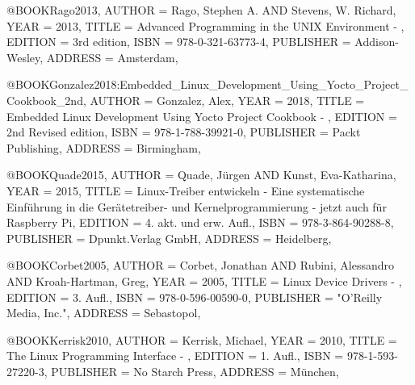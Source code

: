 @BOOK{Rago2013,
	AUTHOR = {Rago, Stephen A. AND Stevens, W. Richard},
	YEAR = {2013},
	TITLE = {Advanced Programming in the UNIX Environment - },
	EDITION = {3rd edition},
	ISBN = {978-0-321-63773-4},
	PUBLISHER = {Addison-Wesley},
	ADDRESS = {Amsterdam},
}


@BOOK{Gonzalez2018:Embedded_Linux_Development_Using_Yocto_Project_Cookbook_2nd,
	AUTHOR = {Gonzalez, Alex},
	YEAR = {2018},
	TITLE = {Embedded Linux Development Using Yocto Project Cookbook - },
	EDITION = {2nd Revised edition},
	ISBN = {978-1-788-39921-0},
	PUBLISHER = {Packt Publishing},
	ADDRESS = {Birmingham},
}


@BOOK{Quade2015,
	AUTHOR = {Quade, Jürgen AND Kunst, Eva-Katharina},
	YEAR = {2015},
	TITLE = {Linux-Treiber entwickeln - Eine systematische Einführung in die Gerätetreiber- und Kernelprogrammierung - jetzt auch für Raspberry Pi},
	EDITION = {4. akt. und erw. Aufl.},
	ISBN = {978-3-864-90288-8},
	PUBLISHER = {Dpunkt.Verlag GmbH},
	ADDRESS = {Heidelberg},
}


@BOOK{Corbet2005,
	AUTHOR = {Corbet, Jonathan AND Rubini, Alessandro AND Kroah-Hartman, Greg},
	YEAR = {2005},
	TITLE = {Linux Device Drivers - },
	EDITION = {3. Aufl.},
	ISBN = {978-0-596-00590-0},
	PUBLISHER = {"O'Reilly Media, Inc."},
	ADDRESS = {Sebastopol},
}

@BOOK{Kerrisk2010,
	AUTHOR = {Kerrisk, Michael},
	YEAR = {2010},
	TITLE = {The Linux Programming Interface - },
	EDITION = {1. Aufl.},
	ISBN = {978-1-593-27220-3},
	PUBLISHER = {No Starch Press},
	ADDRESS = {München},
}



